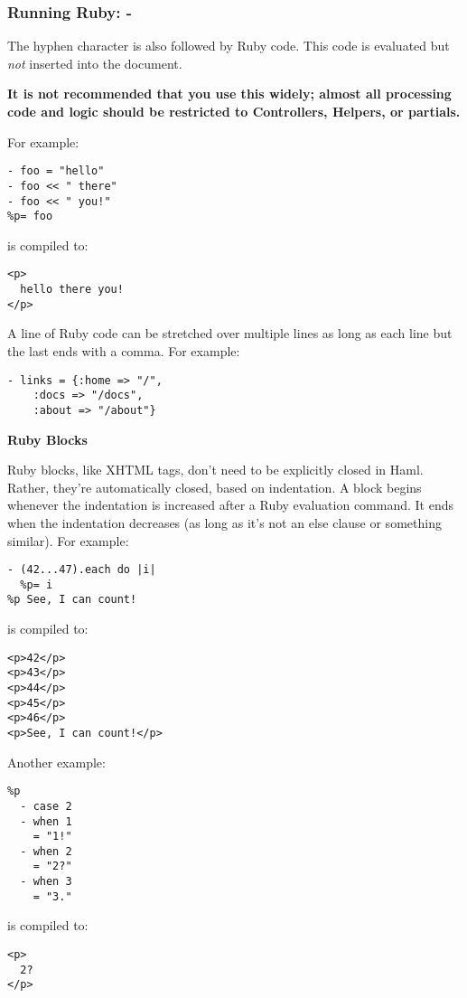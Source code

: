 \documentclass[10pt]{article}
\begin{document}
\subsubsection*{Running Ruby: -}


 The hyphen character is also followed by Ruby code. This code is evaluated but \emph{not}
 inserted into the document.


 \textbf{It is not recommended that you use this widely; almost all processing code and logic should be restricted to Controllers, Helpers, or partials.}



 For example:
\begin{verbatim}
- foo = "hello"
- foo << " there"
- foo << " you!"
%p= foo
\end{verbatim}


 is compiled to:
\begin{verbatim}
<p>
  hello there you!
</p>
\end{verbatim}


 A line of Ruby code can be stretched over multiple lines as long as each line but the last ends with a comma. For example:
\begin{verbatim}
- links = {:home => "/",
    :docs => "/docs",
    :about => "/about"}
\end{verbatim}
\textbf{Ruby Blocks}


 Ruby blocks, like XHTML tags, don’t need to be explicitly closed in Haml. Rather, they’re automatically closed, based on indentation. A block begins whenever the indentation is increased after a Ruby evaluation command. It ends when the indentation decreases (as long as it’s not an else clause or something similar). For example:
\begin{verbatim}
- (42...47).each do |i|
  %p= i
%p See, I can count!
\end{verbatim}


 is compiled to:
\begin{verbatim}
<p>42</p>
<p>43</p>
<p>44</p>
<p>45</p>
<p>46</p>
<p>See, I can count!</p>
\end{verbatim}


 Another example:
\begin{verbatim}
%p
  - case 2
  - when 1
    = "1!"
  - when 2
    = "2?"
  - when 3
    = "3."
\end{verbatim}


 is compiled to:
\begin{verbatim}
<p>
  2?
</p>
\end{verbatim}
\end{document}
